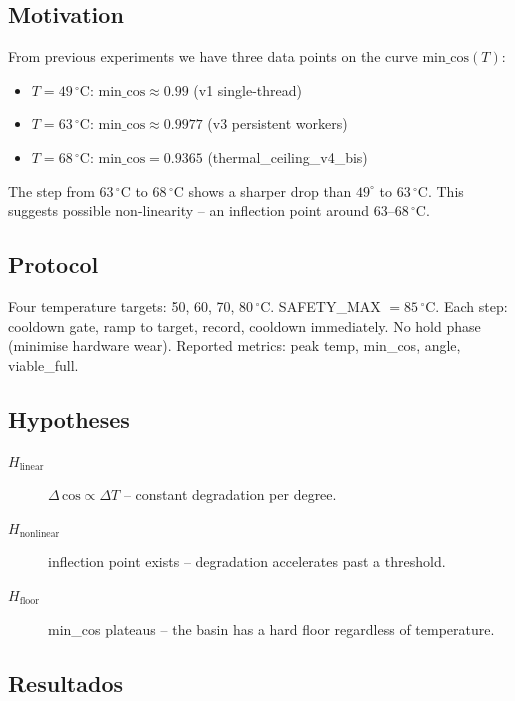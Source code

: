 \documentclass[11pt, a4paper]{article}
\begin{document}
\subsection{Motivation}

From previous experiments we have three data points on the curve
$\text{min\_cos}(T)$:
\begin{itemize}
  \item $T = 49\,^\circ\mathrm{C}$: $\text{min\_cos} \approx 0.99$ (v1 single-thread)
  \item $T = 63\,^\circ\mathrm{C}$: $\text{min\_cos} \approx 0.9977$ (v3 persistent workers)
  \item $T = 68\,^\circ\mathrm{C}$: $\text{min\_cos} = 0.9365$ (thermal\_ceiling\_v4\_bis)
\end{itemize}

The step from $63\,^\circ\mathrm{C}$ to $68\,^\circ\mathrm{C}$ shows a sharper drop than
$49^\circ$ to $63\,^\circ\mathrm{C}$.
This suggests possible non-linearity -- an inflection point around $63$--$68\,^\circ\mathrm{C}$.

\subsection{Protocol}

Four temperature targets: 50, 60, 70, 80\,$^\circ$C.
SAFETY\_MAX $= 85\,^\circ\mathrm{C}$.
Each step: cooldown gate, ramp to target, record, cooldown immediately.
No hold phase (minimise hardware wear).
Reported metrics: peak temp, min\_cos, angle, viable\_full.

\subsection{Hypotheses}

\begin{description}
  \item[$H_\text{linear}$] $\Delta\,\text{cos} \propto \Delta T$ -- constant
        degradation per degree.
  \item[$H_\text{nonlinear}$] inflection point exists -- degradation
        accelerates past a threshold.
  \item[$H_\text{floor}$] min\_cos plateaus -- the basin has a hard floor
        regardless of temperature.
\end{description}

\subsection{Resultados}
\end{document}
